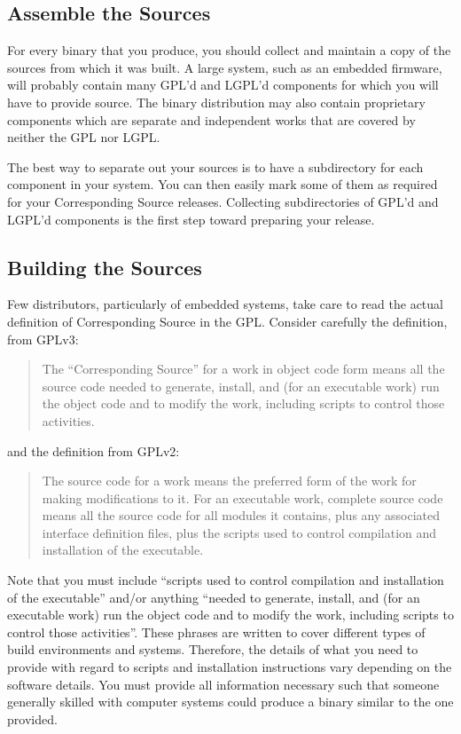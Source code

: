 \subsection{Assemble the Sources}

For every binary that you produce, you should collect and maintain a copy
of the sources from which it was built.  A large system, such as an
embedded firmware, will probably contain many GPL'd and LGPL'd components
for which you will have to provide source.  The binary distribution may
also contain proprietary components which are separate and independent
works that are covered by neither the GPL nor LGPL\@.

The best way to separate out your sources is to have a subdirectory for
each component in your system.  You can then easily mark some of them as
required for your Corresponding Source releases.  Collecting
subdirectories of GPL'd and LGPL'd components is the first step toward
preparing your release.

\subsection{Building the Sources}

Few distributors, particularly of embedded systems, take care to read the
actual definition of Corresponding Source in the GPL\@.  Consider
carefully the definition, from GPLv3:
\begin{quote}
  The ``Corresponding Source'' for a work in object code form means all
  the source code needed to generate, install, and (for an executable
  work) run the object code and to modify the work, including scripts to
  control those activities.
\end{quote}

and the definition from GPLv2:
\begin{quote}
The source code for a work means the preferred form of the work for making
modifications to it.  For an executable work, complete source code means
all the source code for all modules it contains, plus any associated
interface definition files, plus the scripts used to control compilation
and installation of the executable.
\end{quote}

Note that you must include ``scripts used to control compilation and
installation of the executable'' and/or anything ``needed to generate,
install, and (for an executable work) run the object code and to modify
the work, including scripts to control those activities''.  These phrases
are written to cover different types of build environments and systems.
Therefore, the details of what you need to provide with regard to scripts
and installation instructions vary depending on the software details.  You
must provide all information necessary such that someone generally skilled
with computer systems could produce a binary similar to the one provided.

